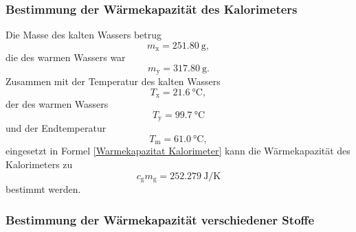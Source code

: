 \subsubsection{Bestimmung der Wärmekapazität des Kalorimeters}
	Die Masse des kalten Wassers betrug
	\begin{equation*}
		m_\text{x} = \SI{251.80}{\gram},
	\end{equation*}
	die des warmen Wassers war
	\begin{equation*}
		m_\text{y} = \SI{317.80}{\g}.
	\end{equation*}
	Zusammen mit der Temperatur des kalten Wassers
	\begin{equation*}
		T_\text{x} = \SI{21.6}{\celsius},
	\end{equation*}
	der des warmen Wassers
	\begin{equation*}
		T_\text{y} = \SI{99.7}{\celsius}
	\end{equation*}
	und der Endtemperatur
	\begin{equation*}
		T_\text{m} = \SI{61.0}{\celsius},
	\end{equation*}
	eingesetzt in Formel \eqref{Warmekapazitat Kalorimeter} kann die Wärmekapazität des Kalorimeters zu
	\begin{equation}
		c_\text{g}m_\text{g} = \SI{252.279}{\joule\per\kelvin}
	\end{equation}
	bestimmt werden.


\subsubsection{Bestimmung der Wärmekapazität verschiedener Stoffe}
